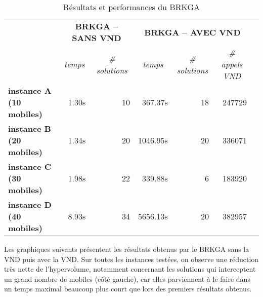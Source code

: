             \begin{table}[H]
                \centering
                \begin{tabular}{r|r|r|r|r|r|l}
                \cline{2-6}
                \multicolumn{1}{l|}{\multirow{2}{*}{}}                 & \multicolumn{2}{c|}{\textbf{BRKGA -- SANS VND}}                                  & \multicolumn{3}{c|}{\textbf{BRKGA -- AVEC VND}}                                                                                &  \\ \cline{2-6}
                \multicolumn{1}{l|}{}                                  & \multicolumn{1}{c|}{\textit{temps}} & \multicolumn{1}{c|}{\textit{\# solutions}} & \multicolumn{1}{c|}{\textit{temps}} & \multicolumn{1}{c|}{\textit{\# solutions}} & \multicolumn{1}{c|}{\textit{\# appels VND}} &  \\ \cline{1-6}
                \multicolumn{1}{|l|}{\textbf{instance A (10 mobiles)}} & 1.30s                               & 10                                         & 367.37s                             & 18                                         & 247729                                      &  \\ \cline{1-6}
                \multicolumn{1}{|l|}{\textbf{instance B (20 mobiles)}} & 1.34s                               & 20                                         & 1046.95s                            & 20                                         & 336071                                      &  \\ \cline{1-6}
                \multicolumn{1}{|l|}{\textbf{instance C (30 mobiles)}} & 1.98s                               & 22                                         & 339.88s                             & 6                                          & 183920                                      &  \\ \cline{1-6}
                \multicolumn{1}{|l|}{\textbf{instance D (40 mobiles)}} & 8.93s                               & 34                                         & 5656.13s                            & 20                                         & 382957                                      &  \\ \cline{1-6}
                \end{tabular}
                \caption{Résultats et performances du BRKGA}
                \label{tab:brkga}
            \end{table}
            
            Les graphiques suivants présentent les résultats obtenus par le BRKGA sans la VND puis avec la VND. Sur toutes les instances testées, on observe une réduction très nette de l'hypervolume, notamment concernant les solutions qui interceptent un grand nombre de mobiles (côté gauche), car elles parviennent à le faire dans un temps maximal beaucoup plus court que lors des premiers résultats obtenus.
            
